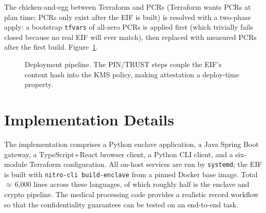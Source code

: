 \documentclass[11pt]{article}
\begin{document}
The chicken-and-egg between Terraform and PCRs (Terraform wants
PCRs at plan time; PCRs only exist after the EIF is built) is
resolved with a two-phase apply: a bootstrap \texttt{tfvars} of
all-zero PCRs is applied first (which trivially fails closed
because no real EIF will ever match), then replaced with measured
PCRs after the first build. Figure~\ref{fig:pipe}.

\begin{figure}[t]
\centering
{}
\caption{Deployment pipeline. The PIN/TRUST steps couple the EIF's
content hash into the KMS policy, making attestation a deploy-time
property.}
\label{fig:pipe}
\end{figure}

\section{Implementation Details}

The implementation comprises a Python enclave application, a Java
Spring Boot gateway, a TypeScript+React browser client, a Python
CLI client, and a six-module Terraform configuration. All on-host
services are run by \texttt{systemd}; the EIF is built with
\texttt{nitro-cli build-enclave} \cite{nitrocli} from a pinned
Docker base image. Total $\approx$\,6{,}000 lines across these
languages, of which roughly half is the enclave and crypto
pipeline. The medical processing code provides a realistic record
workflow so that the confidentiality guarantees can be tested on an
end-to-end task.
\end{document}
